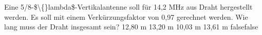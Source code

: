    {Eine 5/8-\$\textbackslash\{\}lambda\$-Vertikalantenne soll für 14,2 MHz aus Draht hergestellt werden. Es soll mit einem Verkürzungsfaktor von 0,97 gerechnet werden. Wie lang muss der Draht insgesamt sein?}
    {12,80 m}
    {13,20 m}
    {10,03 m}
    {13,61 m}
    {false}{false}